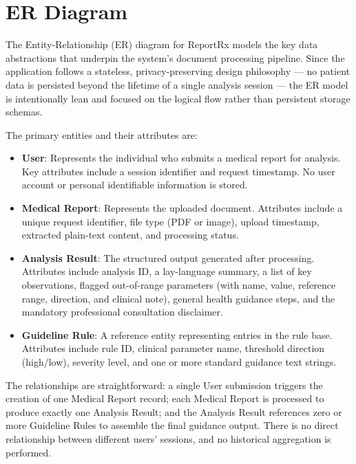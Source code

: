 \section{ER Diagram}
The Entity-Relationship (ER) diagram for ReportRx models the key data abstractions that underpin the system's document processing pipeline. Since the application follows a stateless, privacy-preserving design philosophy --- no patient data is persisted beyond the lifetime of a single analysis session --- the ER model is intentionally lean and focused on the logical flow rather than persistent storage schemas.

The primary entities and their attributes are:

\begin{itemize}
    \item \textbf{User}: Represents the individual who submits a medical report for analysis. Key attributes include a session identifier and request timestamp. No user account or personal identifiable information is stored.
    \item \textbf{Medical Report}: Represents the uploaded document. Attributes include a unique request identifier, file type (PDF or image), upload timestamp, extracted plain-text content, and processing status.
    \item \textbf{Analysis Result}: The structured output generated after processing. Attributes include analysis ID, a lay-language summary, a list of key observations, flagged out-of-range parameters (with name, value, reference range, direction, and clinical note), general health guidance steps, and the mandatory professional consultation disclaimer.
    \item \textbf{Guideline Rule}: A reference entity representing entries in the rule base. Attributes include rule ID, clinical parameter name, threshold direction (high/low), severity level, and one or more standard guidance text strings.
\end{itemize}

The relationships are straightforward: a single User submission triggers the creation of one Medical Report record; each Medical Report is processed to produce exactly one Analysis Result; and the Analysis Result references zero or more Guideline Rules to assemble the final guidance output. There is no direct relationship between different users' sessions, and no historical aggregation is performed.

